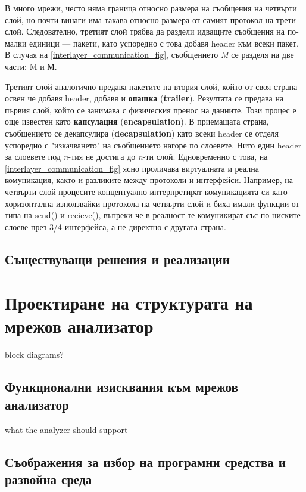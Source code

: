 \documentclass[12pt,a4paper,oneside]{book}
\begin{document}
В много мрежи, често няма граница относно размера на съобщения на четвърти слой,
но почти винаги има такава относно размера от самият протокол на трети слой.
Следователно, третият слой трябва да раздели идващите съобщения на по-малки
единици --- пакети, като успоредно с това добавя header към всеки пакет. В
случая на \autoref{interlayer_communication_fig}, съобщението \textit{M} се
разделя на две части: M и М.

Третият слой аналогично предава пакетите на втория слой, който от своя страна
освен че добавя header, добавя и \textbf{опашка} (\textbf{trailer}). Резултата
се предава на първия слой, който се занимава с физическия пренос на данните.
Този процес е още известен като \textbf{капсулация} (\textbf{encapsulation}). В
приемащата страна, съобщението се декапсулира (\textbf{decapsulation}) като
всеки header се отделя успоредно с "изкачването" на съобщението нагоре по
слоевете. Нито един header за слоевете под \textit{n}-тия не достига до
\textit{n}-ти слой. Едновременно с това, на
\autoref{interlayer_communication_fig} ясно проличава виртуалната и реална
комуникация, както и разликите между протоколи и интерфейси. Например, на
четвърти слой процесите концептуално интерпретират комуникацията си като
хоризонтална използвайки протокола на четвърти слой и биха имали функции от типа
на send() и recieve(), въпреки че в реалност те комуникират със по-ниските
слоеве през 3/4 интерфейса, а не директно с другата страна.

\vfill

\section{Съществуващи решения и реализации}

\chapter{Проектиране на структурата на мрежов анализатор}

block diagrams?
\section{Функционални изисквания към мрежов анализатор}

what the analyzer should support

\section{Съображения за избор на програмни средства и развойна среда}
\end{document}
